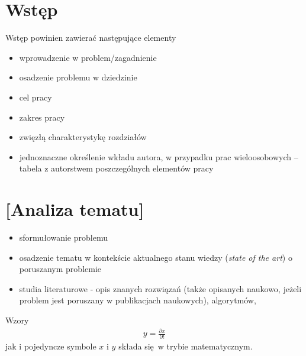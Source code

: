 \documentclass[a4paper,twoside,12pt]{book}
\newcommand{\obcy}[1]{\emph{#1}}
\newcommand{\english}[1]{{\selectlanguage{british}\obcy{#1}}}
\newcounter{stronyPozaNumeracja}
\begin{document}
\tableofcontents

\setcounter{stronyPozaNumeracja}{\value{page}}
\mainmatter
\pagestyle{empty}

\cleardoublepage

\pagestyle{NumeryStronNazwyRozdzialow}


\chapter{Wstęp}
\label{ch:wstep}
Wstęp powinien zawierać następujące elementy
\begin{itemize}
\item wprowadzenie w problem/zagadnienie
\item osadzenie problemu w dziedzinie
\item cel pracy
\item zakres pracy
\item zwięzłą charakterystykę rozdziałów
\item jednoznaczne określenie wkładu autora, w przypadku prac wieloosobowych – tabela z autorstwem poszczególnych elementów pracy
\end{itemize}



\chapter{[Analiza tematu]}

\begin{itemize}
\item sformułowanie problemu
\item osadzenie tematu w kontekście aktualnego stanu wiedzy (\english{state of the art}) o poruszanym problemie
\item  studia literaturowe \cite{bib:artykul,bib:ksiazka,bib:konferencja,bib:internet} -  opis znanych rozwiązań (także opisanych naukowo, jeżeli problem jest poruszany w publikacjach naukowych), algorytmów, 
\end{itemize}


Wzory  
\begin{align}
y = \frac{\partial x}{\partial t}
\end{align}
jak i pojedyncze symbole $x$ i $y$  składa się w trybie matematycznym.
\end{document}
